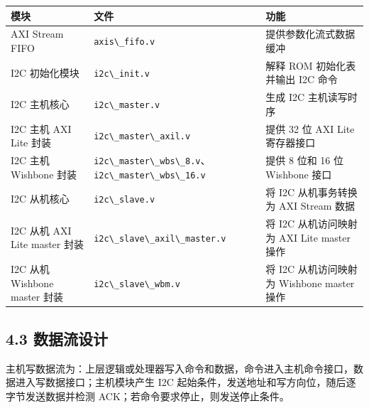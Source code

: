 {\def\LTcaptype{none} %
\begin{longtable}[]{@{}
  >{\raggedright\arraybackslash}p{}
  >{\raggedright\arraybackslash}p{}
  >{\raggedright\arraybackslash}p{}@{}}
\toprule\noalign{}
\begin{minipage}[b]{\linewidth}\raggedright
模块
\end{minipage} & \begin{minipage}[b]{\linewidth}\raggedright
文件
\end{minipage} & \begin{minipage}[b]{\linewidth}\raggedright
功能
\end{minipage} \\
\midrule\noalign{}
\endhead
\bottomrule\noalign{}
\endlastfoot
AXI Stream FIFO & \passthrough{\lstinline!axis\_fifo.v!} &
提供参数化流式数据缓冲 \\
I2C 初始化模块 & \passthrough{\lstinline!i2c\_init.v!} & 解释 ROM
初始化表并输出 I2C 命令 \\
I2C 主机核心 & \passthrough{\lstinline!i2c\_master.v!} & 生成 I2C
主机读写时序 \\
I2C 主机 AXI Lite 封装 & \passthrough{\lstinline!i2c\_master\_axil.v!} &
提供 32 位 AXI Lite 寄存器接口 \\
I2C 主机 Wishbone 封装 &
\passthrough{\lstinline!i2c\_master\_wbs\_8.v!}、\passthrough{\lstinline!i2c\_master\_wbs\_16.v!}
& 提供 8 位和 16 位 Wishbone 接口 \\
I2C 从机核心 & \passthrough{\lstinline!i2c\_slave.v!} & 将 I2C
从机事务转换为 AXI Stream 数据 \\
I2C 从机 AXI Lite master 封装 &
\passthrough{\lstinline!i2c\_slave\_axil\_master.v!} & 将 I2C
从机访问映射为 AXI Lite master 操作 \\
I2C 从机 Wishbone master 封装 &
\passthrough{\lstinline!i2c\_slave\_wbm.v!} & 将 I2C 从机访问映射为
Wishbone master 操作 \\
\end{longtable}
}

\subsection{4.3 数据流设计}\label{ux6570ux636eux6d41ux8bbeux8ba1}

主机写数据流为：上层逻辑或处理器写入命令和数据，命令进入主机命令接口，数据进入写数据接口；主机模块产生
I2C 起始条件，发送地址和写方向位，随后逐字节发送数据并检测
ACK；若命令要求停止，则发送停止条件。

